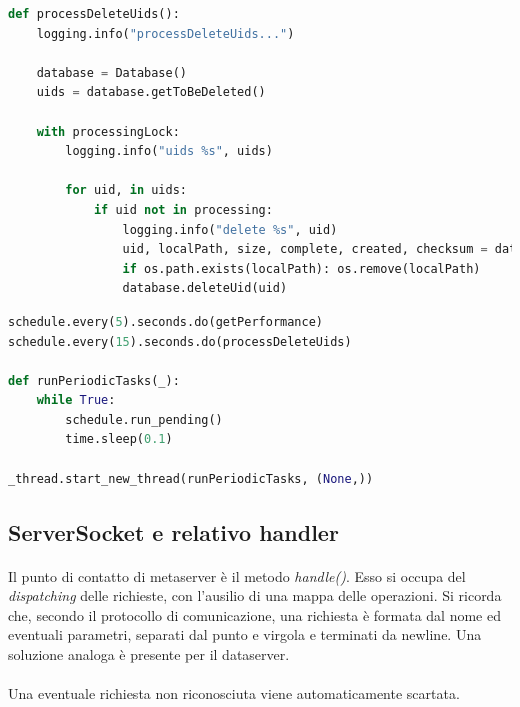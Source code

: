 \documentclass{article}
\begin{document}
\begin{lstlisting}[language=Python, title=Eliminazione dei documenti in coda]
def processDeleteUids():
    logging.info("processDeleteUids...")

    database = Database()
    uids = database.getToBeDeleted()

    with processingLock:
        logging.info("uids %s", uids)

        for uid, in uids:
            if uid not in processing:
                logging.info("delete %s", uid)
                uid, localPath, size, complete, created, checksum = database.getObject(uid)
                if os.path.exists(localPath): os.remove(localPath)
                database.deleteUid(uid)
\end{lstlisting}

\begin{lstlisting}[language=Python, title=Scheduling ed esecuzione]
schedule.every(5).seconds.do(getPerformance)
schedule.every(15).seconds.do(processDeleteUids)

def runPeriodicTasks(_):
    while True:
        schedule.run_pending()
        time.sleep(0.1)

_thread.start_new_thread(runPeriodicTasks, (None,))
\end{lstlisting}


\subsection{ServerSocket e relativo handler}

\paragraph{} Il punto di contatto di metaserver è il metodo \emph{handle()}. Esso si occupa del \emph{dispatching} delle richieste, con l'ausilio di una mappa delle operazioni. Si ricorda che, secondo il protocollo di comunicazione, una richiesta è formata dal nome ed eventuali parametri, separati dal punto e virgola e terminati da newline. Una soluzione analoga è presente per il dataserver.

\paragraph{} Una eventuale richiesta non riconosciuta viene automaticamente scartata.
\end{document}
